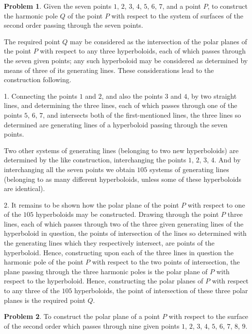 \documentclass[11pt,a4paper]{article}
\theoremstyle{definition}
\newtheorem*{problem}{Problem}
\begin{document}
\begin{problem}
Given the seven points $1$, $2$, $3$, $4$, $5$, $6$, $7$, and a point $P$, to construct the harmonic pole $Q$ of the point $P$ with respect to the system of surfaces of the second order passing through the seven points.
\end{problem}

The required point $Q$ may be considered as the intersection of the polar planes of the point $P$ with respect to any three hyperboloids, each of which passes through the seven given points; any such hyperboloid may be considered as determined by means of three of its generating lines. These considerations lead to the construction following.

1. Connecting the points $1$ and $2$, and also the points $3$ and $4$, by two straight lines, and determining the three lines, each of which passes through one of the points $5$, $6$, $7$, and intersects both of the first-mentioned lines, the three lines so determined are generating lines of a hyperboloid passing through the seven points.

Two other systems of generating lines (belonging to two new hyperboloids) are determined by the like construction, interchanging the points $1$, $2$, $3$, $4$. And by interchanging all the seven points we obtain $105$ systems of generating lines (belonging to as many different hyperboloids, unless some of these hyperboloids are identical).

2. It remains to be shown how the polar plane of the point $P$ with respect to one of the $105$ hyperboloids may be constructed. Drawing through the point $P$ three lines, each of which passes through two of the three given generating lines of the hyperboloid in question, the points of intersection of the lines so determined with the generating lines which they respectively intersect, are points of the hyperboloid. Hence, constructing upon each of the three lines in question the harmonic pole of the point $P$ with respect to the two points of intersection, the plane passing through the three harmonic poles is the polar plane of $P$ with respect to the hyperboloid. Hence, constructing the polar planes of $P$ with respect to any three of the $105$ hyperboloids, the point of intersection of these three polar planes is the required point $Q$.

\begin{problem}
To construct the polar plane of a point $P$ with respect to the surface of the second order which passes through nine given points $1$, $2$, $3$, $4$, $5$, $6$, $7$, $8$, $9$.
\end{problem}
\end{document}
